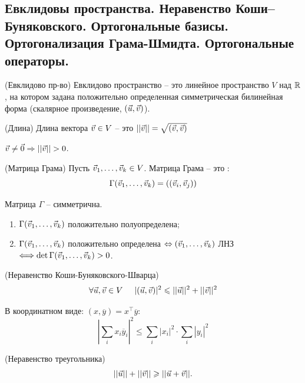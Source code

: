 \begin{multicols}{2}
\section{Евклидовы пространства. Неравенство Коши–Буняковского. Ортогональные базисы.
Ортогонализация Грама-Шмидта. Ортогональные операторы.}
\begin{definition}{(Евклидово пр-во)}{}
    Евклидово пространство -- это линейное пространство $V$ над $\mathbb{R}$, на котором задана положительно определенная симметрическая билинейная форма (скалярное произведение, $(\vec{u}, \vec{v})$).
\end{definition}
\begin{definition}{(Длина)}{}
    Длина вектора $\vec{v}\in V$ -- это $||\vec{v}|| = \sqrt{(\vec{v}, \vec{v})}$
\end{definition}
$\vec{v} \neq \vec{0} \Rightarrow ||\vec{v}|| > 0$.
\begin{definition}{(Матрица Грама)}{}
    Пусть $\vec{v}_1, \ldots, \vec{v}_k \in V$. Матрица Грама -- это :
    \[
        \Gamma (\vec{v}_1, \ldots, \vec{v}_k) = \left((\vec{v}_i, \vec{v}_j)\right)
    \]
\end{definition}
Матрица $\Gamma$ -- симметрична.
\begin{proposition}{}{}
    \begin{enumerate}
        \item $\Gamma(\vec{v}_1, \ldots, \vec{v}_k)$ положительно полуопределена;
        \item $\Gamma(\vec{v}_1, \ldots, \vec{v}_k)$ положительно определена $\Leftrightarrow (\vec{v}_1, \ldots, \vec{v}_k)$ ЛНЗ $\Longleftrightarrow \det \Gamma (\vec{v}_1, \ldots, \vec{v}_k) > 0$. 
    \end{enumerate}
\end{proposition} 
\begin{theorema}{(Неравенство Коши-Буняковского-Шварца)}{}
 \[
    \forall \vec{u}, \vec{v} \in V \hspace*{0.5cm} |(\vec{u}, \vec{v})|^2 \leqslant ||\vec{u}||^2 + ||\vec{v}||^2    
 \]
\end{theorema}
\begin{note}{}{}
    В координатном виде: $(x,\overline{y}) = x^\intercal \overline{y}$:
    \[
        \left|\sum\limits_{i}x_i \overline{y}_i\right|^2 \leq \sum\limits_i |x_i|^2 \cdot \sum\limits_i |y_i|^2
    \]
\end{note}
\begin{theorema}{(Неравенство треугольника)}{}
    \[
        ||\vec{u}|| + ||\vec{v}|| \geqslant ||\vec{u} + \vec{v}||.
    \]
\end{theorema}
\begin{note}{}{}

\end{note}
\end{multicols}
